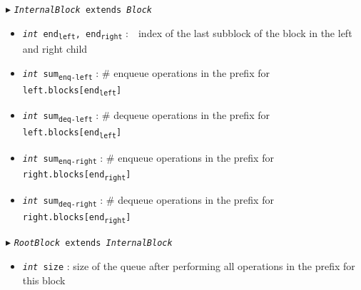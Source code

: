 \documentclass[10pt]{article}
\newcommand{\sub}[1]{\textsubscript{#1}}
\renewcommand{\tt}[1]{\texttt{#1}}
\renewcommand{\sl}[1]{\textsl{#1}}
\newcommand{\size}{size}
\theoremstyle{definition}
\begin{document}
\begin{algorithm}
\begin{algorithmic}[1]
\begin{multicols}{2}
\begin{itemize}
\end{itemize}



\Statex $\blacktriangleright$ \tt{\sl{InternalBlock} extends \sl{Block}}
\begin{itemize}
    \item \tt{\sl{int} end\sub{left}, end\sub{right}}
  \textsf{:~~index of the last subblock of the block in the left and right child}
  \item \tt{\sl{int} sum\sub{enq-left}}
  \textsf{: \# enqueue operations in the prefix for \tt{left.blocks[end\sub{left}]}}
  \item \tt{\sl{int} sum\sub{deq-left}}
  \textsf{: \# dequeue operations in the prefix for \tt{left.blocks[end\sub{left}]}}
  \item \tt{\sl{int} sum\sub{enq-right}}
  \textsf{: \# enqueue operations in the prefix for \tt{right.blocks[end\sub{right}]}}
  \item \tt{\sl{int} sum\sub{deq-right}}
  \textsf{: \# dequeue operations in the prefix for \tt{right.blocks[end\sub{right}]}}
\end{itemize}


\Statex $\blacktriangleright$ \tt{\sl{RootBlock} extends \sl{InternalBlock}}
\begin{itemize}
  \item \tt{\sl{int} \size}
  \textsf{: size of the queue after performing all operations in the prefix for this block}
\end{itemize}



\end{multicols}
\end{algorithmic}
\end{algorithm}
\end{document}
